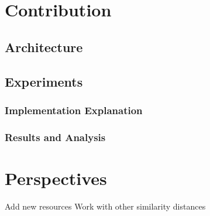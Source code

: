 \section{Contribution} %
\label{sec:contribution}

\subsection{Architecture} %
\label{sub:architecture}


\subsection{Experiments} %
\label{sub:experiments}
\subsubsection{Implementation Explanation} %
\label{ssub:implementation_explanation}

\subsubsection{Results and Analysis} %
\label{ssub:results_and_analysis}



\section{Perspectives} %
\label{sec:perspectives}
Add new resources
Work with other similarity distances

